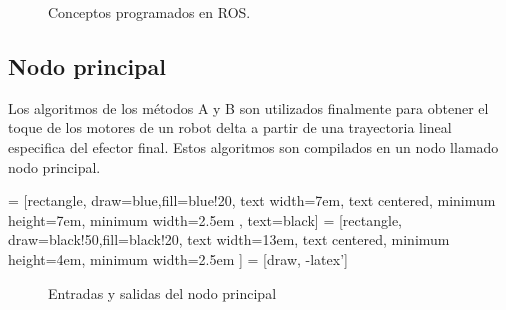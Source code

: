 \begin{center}
\begin{figure}[H]
            
                \caption{Conceptos programados en ROS.}
                \label{fig:my_label}
        \end{figure}
 \end{center}
   
    \newpage
    
    \subsection{Nodo principal}\label{nodoprincipal_tray}
    Los algoritmos de los métodos A y B son utilizados finalmente para obtener el toque de los motores de un robot delta a partir de una trayectoria lineal especifica del efector final. Estos algoritmos son compilados en un nodo llamado nodo principal. 
    
         = [rectangle, draw=blue,fill=blue!20, text width=7em, text centered, minimum height=7em, minimum width=2.5em , text=black]
         = [rectangle, draw=black!50,fill=black!20, text width=13em, text centered, minimum height=4em, minimum width=2.5em ]
         = [draw, -latex']
         \begin{center}
         \begin{figure}[htb]
                \caption{Entradas y salidas del nodo principal}
                \label{f:Cap6_funtion_1333}
         \end{figure}
         \end{center}
         
